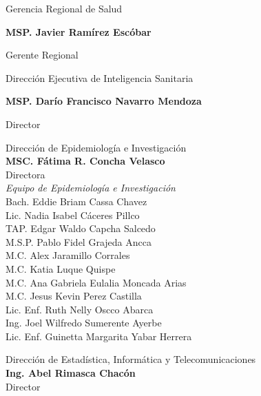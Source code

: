 \documentclass[12pt,a4paper,openany]{book}
\begin{document}
	
	\begin{center}
	
		{\large Gerencia Regional de Salud}
		
		\textbf{MSP. Javier Ramírez Escóbar}
		
		Gerente Regional \vspace{1.0cm}
		
		Dirección Ejecutiva de Inteligencia Sanitaria
		
		\textbf{MSP. Darío Francisco Navarro Mendoza}
		
		Director
		
		\vspace{1.5cm}
\noindent
\begin{minipage}[t]{.45\textwidth}
	\centering
	Dirección de Epidemiología e Investigación  \\
	\textbf{MSC. Fátima R. Concha Velasco}\\
	Directora \vspace{1.0cm}\\
	\textit{Equipo de Epidemiología e Investigación }\vspace{.5cm}\\
	Bach. Eddie Briam Cassa Chavez \\
	Lic. Nadia Isabel Cáceres Pillco \\
	TAP. Edgar Waldo Capcha Salcedo \\
	M.S.P. Pablo Fidel Grajeda Ancca \\
	M.C. Alex Jaramillo Corrales \\ 
	M.C. Katia Luque Quispe \\
	M.C. Ana Gabriela Eulalia Moncada Arias \\
	M.C. Jesus Kevin Perez Castilla \\
	Lic. Enf. Ruth Nelly Oscco Abarca \\
	Ing. Joel Wilfredo Sumerente Ayerbe \\
	Lic. Enf. Guinetta Margarita Yabar Herrera \vspace{1.5cm}\\	
\end{minipage}
\hfill
\noindent
\begin{minipage}[t]{.45\textwidth}
	\centering
	Dirección de Estadística, Informática y Telecomunicaciones\\
	\textbf{Ing. Abel Rimasca Chacón} \\
	Director \vspace{1.0cm} \\

\end{minipage}
\end{center}
\end{document}
